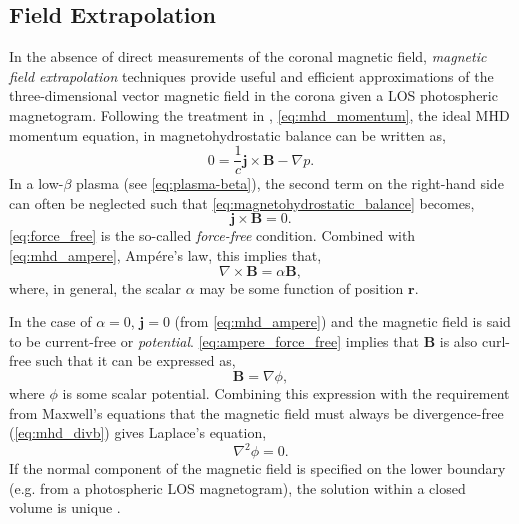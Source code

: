 \subsection{Field Extrapolation}\label{sec:field_extrapolation}

In the absence of direct measurements of the coronal magnetic field, \textit{magnetic field extrapolation} techniques provide useful and efficient approximations of the three-dimensional vector magnetic field in the corona given a LOS photospheric magnetogram. Following the treatment in \citet[Chapter 3]{priest_magnetohydrodynamics_2014}, \autoref{eq:mhd_momentum}, the ideal MHD momentum equation, in magnetohydrostatic balance can be written as,
\begin{equation}\label{eq:magnetohydrostatic_balance}
    0 = \frac{1}{c}\mathbf{j}\times\mathbf{B} - \nabla p.
\end{equation}
In a low-$\beta$ plasma (see \autoref{eq:plasma-beta}), the second term on the right-hand side can often be neglected such that \autoref{eq:magnetohydrostatic_balance} becomes,
\begin{equation}\label{eq:force_free}
    \mathbf{j}\times\mathbf{B} = 0.
\end{equation}
\autoref{eq:force_free} is the so-called \textit{force-free} condition. Combined with \autoref{eq:mhd_ampere}, Amp\'{e}re's law, this implies that,
\begin{equation}\label{eq:ampere_force_free}
    \nabla\times\mathbf{B} = \alpha\mathbf{B},
\end{equation}
where, in general, the scalar $\alpha$ may be some function of position $\mathbf{r}$.

In the case of $\alpha=0$, $\mathbf{j}=0$ (from \autoref{eq:mhd_ampere}) and the magnetic field is said to be current-free or \textit{potential}. \autoref{eq:ampere_force_free} implies that $\mathbf{B}$ is also curl-free such that it can be expressed as,
\begin{equation}\label{eq:b_potential}
    \mathbf{B}=\nabla\phi,
\end{equation}
 where $\phi$ is some scalar potential. Combining this expression with the requirement from Maxwell's equations that the magnetic field must always be divergence-free (\autoref{eq:mhd_divb}) gives Laplace's equation,
\begin{equation}\label{eq:laplace}
    \nabla^2\phi = 0.
\end{equation}
If the normal component of the magnetic field is specified on the lower boundary (e.g. from a photospheric LOS magnetogram), the solution within a closed volume is unique \citep{priest_magnetohydrodynamics_2014}.

